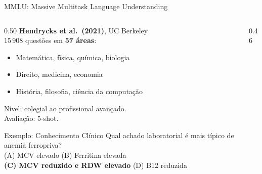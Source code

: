 \documentclass[aspectratio=169, xcolor=dvipsnames]{beamer}
\begin{document}
  \begin{frame}{MMLU: Massive Multitask Language Understanding \cite{hendrycks2021mmlu}}
    \begin{columns}[T]
      \begin{column}{0.50\textwidth}
        \textbf{Hendrycks et al.\ (2021)}, UC Berkeley\\[0.4em]
        15\,908 questões em \textbf{57 áreas}:
        \begin{itemize}
          \item Matemática, física, química, biologia
          \item Direito, medicina, economia
          \item História, filosofia, ciência da computação
        \end{itemize}
        Nível: colegial ao profissional avançado.\\[0.2em]
        Avaliação: 5-shot.\\[0.3em]
        \begin{exampleblock}{Exemplo: Conhecimento Clínico}
          {\footnotesize Qual achado laboratorial é mais típico de anemia ferropriva?\\[0.2em]
          (A) MCV elevado \quad (B) Ferritina elevada\\
          \textbf{(C) MCV reduzido e RDW elevado} \quad (D) B12 reduzida}
        \end{exampleblock}
      \end{column}
      \begin{column}{0.46\textwidth}
      \end{column}
    \end{columns}
  \end{frame}
\end{document}
